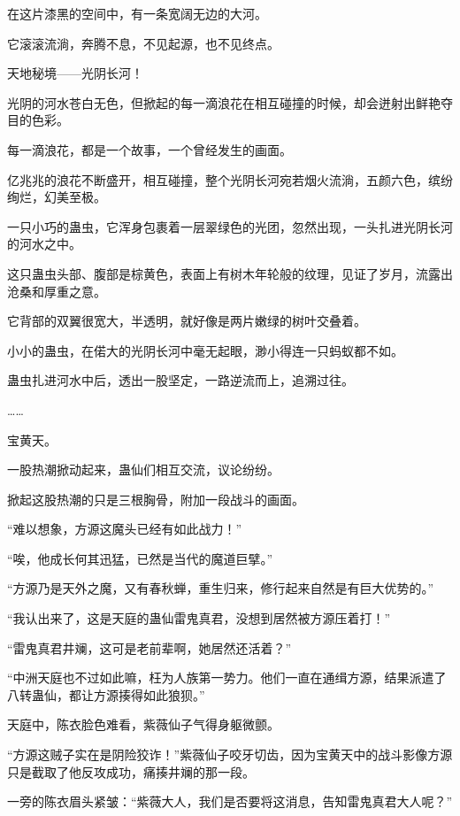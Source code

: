 
\begin{this_body}



在这片漆黑的空间中，有一条宽阔无边的大河。

它滚滚流淌，奔腾不息，不见起源，也不见终点。

天地秘境——光阴长河！

光阴的河水苍白无色，但掀起的每一滴浪花在相互碰撞的时候，却会迸射出鲜艳夺目的色彩。

每一滴浪花，都是一个故事，一个曾经发生的画面。

亿兆兆的浪花不断盛开，相互碰撞，整个光阴长河宛若烟火流淌，五颜六色，缤纷绚烂，幻美至极。

一只小巧的蛊虫，它浑身包裹着一层翠绿色的光团，忽然出现，一头扎进光阴长河的河水之中。

这只蛊虫头部、腹部是棕黄色，表面上有树木年轮般的纹理，见证了岁月，流露出沧桑和厚重之意。

它背部的双翼很宽大，半透明，就好像是两片嫩绿的树叶交叠着。

小小的蛊虫，在偌大的光阴长河中毫无起眼，渺小得连一只蚂蚁都不如。

蛊虫扎进河水中后，透出一股坚定，一路逆流而上，追溯过往。

……

宝黄天。

一股热潮掀动起来，蛊仙们相互交流，议论纷纷。

掀起这股热潮的只是三根胸骨，附加一段战斗的画面。

“难以想象，方源这魔头已经有如此战力！”

“唉，他成长何其迅猛，已然是当代的魔道巨擘。”

“方源乃是天外之魔，又有春秋蝉，重生归来，修行起来自然是有巨大优势的。”

“我认出来了，这是天庭的蛊仙雷鬼真君，没想到居然被方源压着打！”

“雷鬼真君井斓，这可是老前辈啊，她居然还活着？”

“中洲天庭也不过如此嘛，枉为人族第一势力。他们一直在通缉方源，结果派遣了八转蛊仙，都让方源揍得如此狼狈。”

天庭中，陈衣脸色难看，紫薇仙子气得身躯微颤。

“方源这贼子实在是阴险狡诈！”紫薇仙子咬牙切齿，因为宝黄天中的战斗影像方源只是截取了他反攻成功，痛揍井斓的那一段。

一旁的陈衣眉头紧皱：“紫薇大人，我们是否要将这消息，告知雷鬼真君大人呢？”


\end{this_body}

